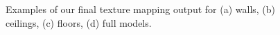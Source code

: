 \documentclass{llncs}
\begin{document}
\begin{figure}

  \centering \subfloat[][]{ }
  \caption{Examples of our final texture mapping output for (a) walls,
    (b) ceilings, (c) floors, (d) full models.}
  \label{fig:results}
\end{figure}



\end{document}
